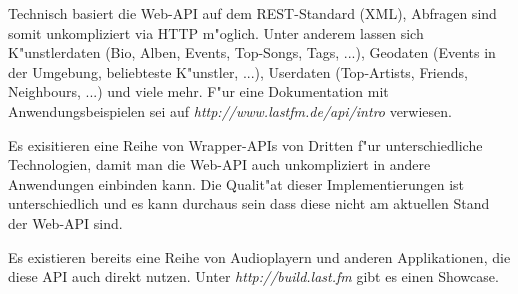 Technisch basiert die Web-API auf dem REST-Standard (XML), Abfragen sind somit unkompliziert via HTTP m"oglich. Unter anderem lassen sich K"unstlerdaten (Bio, Alben, Events, Top-Songs, Tags, ...), Geodaten (Events in der Umgebung, beliebteste K"unstler, ...), Userdaten (Top-Artists, Friends, Neighbours, ...) und viele mehr. F"ur eine Dokumentation mit Anwendungsbeispielen sei auf \textit{http://www.lastfm.de/api/intro} verwiesen. 

Es exisitieren eine Reihe von Wrapper-APIs von Dritten f"ur unterschiedliche Technologien, damit man die Web-API auch unkompliziert in andere Anwendungen einbinden kann. Die Qualit"at dieser Implementierungen ist unterschiedlich und es kann durchaus sein dass diese nicht am aktuellen Stand der Web-API sind.

Es existieren bereits eine Reihe von Audioplayern und anderen Applikationen, die diese API auch direkt nutzen. Unter \textit{http://build.last.fm} gibt es einen Showcase.
